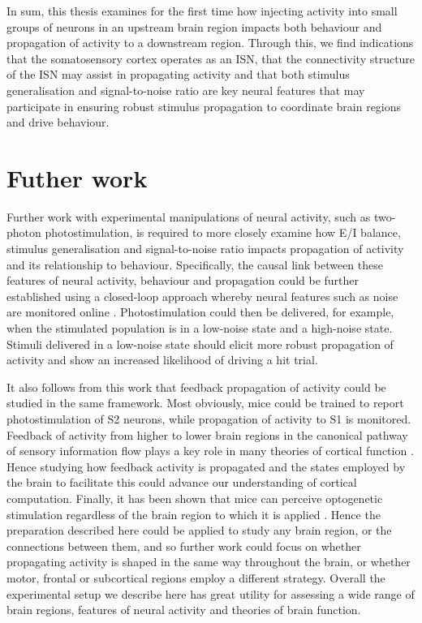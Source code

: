 In sum, this thesis examines for the first time how injecting activity into small groups of neurons in an upstream brain region impacts both behaviour and propagation of activity to a downstream region. Through this, we find indications that the somatosensory cortex operates as an ISN, that the connectivity structure of the ISN may assist in propagating activity and that both stimulus generalisation and signal-to-noise ratio are key neural features that may participate in ensuring robust stimulus propagation to coordinate brain regions and drive behaviour. 

\section{Futher work}
Further work with experimental manipulations of neural activity, such as two-photon photostimulation, is required to more closely examine how E/I balance, stimulus generalisation and signal-to-noise ratio impacts propagation of activity and its relationship to behaviour. Specifically, the causal link between these features of neural activity, behaviour and propagation could be further established using a closed-loop approach \cite{zhang_closed-loop_2018} whereby neural features such as noise are monitored online \cite{giovannucci_onacid_2017-1}. Photostimulation could then be delivered, for example, when the stimulated population is in a low-noise state and a high-noise state. Stimuli delivered in a low-noise state should elicit more robust propagation of activity and show an increased likelihood of driving a hit trial.  

It also follows from this work that feedback propagation of activity could be studied in the same framework. Most obviously, mice could be trained to report photostimulation of S2 neurons, while propagation of activity to S1 is monitored. Feedback of activity from higher to lower brain regions in the canonical pathway of sensory information flow plays a key role in many theories of cortical function \cite{rao_predictive_1999, lillicrap_backpropagation_2020}. Hence studying how feedback activity is propagated and the states employed by the brain to facilitate this could advance our understanding of cortical computation. Finally, it has been shown that mice can perceive optogenetic stimulation regardless of the brain region to which it is applied \cite{luis-islas_interoceptive_2021}. Hence the preparation described here could be applied to study any brain region, or the connections between them, and so further work could focus on whether propagating activity is shaped in the same way throughout the brain, or whether motor, frontal or subcortical regions employ a different strategy. Overall the experimental setup we describe here has great utility for assessing a wide range of brain regions, features of neural activity and theories of brain function.
